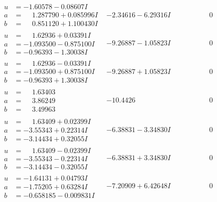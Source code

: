\documentclass[1p]{elsarticle_modified}
\theoremstyle{definition}
\begin{document}
$$\begin{array}{c|c|c}
\begin{aligned}
u &= -1.60578 - 0.08607 I \\
a &= \phantom{-}1.287790 + 0.085996 I \\
b &= \phantom{-}0.851120 + 1.100430 I\end{aligned}
 & -2.34616 - 6.29316 I & \phantom{-0.000000 } 0 \\ \hline\begin{aligned}
u &= \phantom{-}1.62936 + 0.03391 I \\
a &= -1.093500 - 0.875100 I \\
b &= -0.96393 - 1.30038 I\end{aligned}
 & -9.26887 - 1.05823 I & \phantom{-0.000000 } 0 \\ \hline\begin{aligned}
u &= \phantom{-}1.62936 - 0.03391 I \\
a &= -1.093500 + 0.875100 I \\
b &= -0.96393 + 1.30038 I\end{aligned}
 & -9.26887 + 1.05823 I & \phantom{-0.000000 } 0 \\ \hline\begin{aligned}
u &= \phantom{-}1.63403\phantom{ +0.000000I} \\
a &= \phantom{-}3.86249\phantom{ +0.000000I} \\
b &= \phantom{-}3.49963\phantom{ +0.000000I}\end{aligned}
 & -10.4426\phantom{ +0.000000I} & \phantom{-0.000000 } 0 \\ \hline\begin{aligned}
u &= \phantom{-}1.63409 + 0.02399 I \\
a &= -3.55343 + 0.22314 I \\
b &= -3.14434 + 0.32055 I\end{aligned}
 & -6.38831 - 3.34830 I & \phantom{-0.000000 } 0 \\ \hline\begin{aligned}
u &= \phantom{-}1.63409 - 0.02399 I \\
a &= -3.55343 - 0.22314 I \\
b &= -3.14434 - 0.32055 I\end{aligned}
 & -6.38831 + 3.34830 I & \phantom{-0.000000 } 0 \\ \hline\begin{aligned}
u &= -1.64131 + 0.04793 I \\
a &= -1.75205 + 0.63284 I \\
b &= -0.658185 - 0.009831 I\end{aligned}
 & -7.20909 + 6.42648 I & \phantom{-0.000000 } 0\\

\end{array}$$
\end{document}
